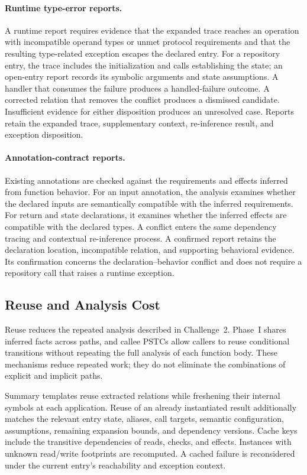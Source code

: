 \paragraph{Runtime type-error reports.}
A runtime report requires evidence that the expanded trace reaches an
operation with incompatible operand types or unmet protocol requirements
and that the resulting type-related exception escapes the declared entry.
For a repository entry, the trace includes
the initialization and calls establishing the state; an open-entry report
records its symbolic arguments and state assumptions. A handler that
consumes the failure produces a handled-failure outcome. A corrected
relation that removes the conflict produces a dismissed candidate.
Insufficient evidence for either disposition produces an unresolved case.
Reports retain the expanded trace, supplementary context, re-inference
result, and exception disposition.

\paragraph{Annotation-contract reports.}
Existing annotations are checked against the requirements and effects
inferred from function behavior. For an input annotation, the analysis
examines whether the declared inputs are semantically compatible with the
inferred requirements. For return and state declarations, it examines
whether the inferred effects are compatible with the declared types.
A conflict enters the same dependency tracing and contextual re-inference
process. A confirmed report retains the declaration location, incompatible
relation, and supporting behavioral evidence. Its confirmation concerns
the declaration--behavior conflict and does not require a repository call
that raises a runtime exception.

\subsection{Reuse and Analysis Cost}
\label{sec:reuse}
Reuse reduces the repeated analysis described in Challenge~2.
Phase~I shares inferred facts across paths, and callee PSTCs
allow callers to reuse conditional transitions without repeating the full
analysis of each function body. These mechanisms reduce repeated work;
they do not eliminate the combinations of explicit and implicit paths.

Summary templates reuse extracted relations while freshening their internal
symbols at each application. Reuse of an already instantiated result
additionally matches the relevant entry state, aliases, call targets,
semantic configuration, assumptions, remaining expansion bounds, and
dependency versions. Cache keys include the transitive dependencies of
reads, checks, and effects. Instances with unknown read/write footprints
are recomputed. A cached failure is reconsidered under the current entry's
reachability and exception context.

